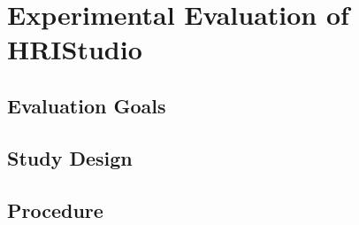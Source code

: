 \chapter{Experimental Evaluation of HRIStudio}
\label{ch:evaluation}

\section{Evaluation Goals}

\section{Study Design}

\section{Procedure}
